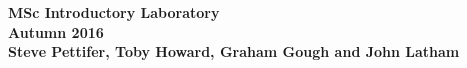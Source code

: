 
\begin{center}
\bfseries\Large MSc Introductory Laboratory\\[2ex]
\large Autumn 2016\\[2ex]
\normalsize Steve Pettifer, Toby Howard, Graham Gough and John Latham
\end{center}






